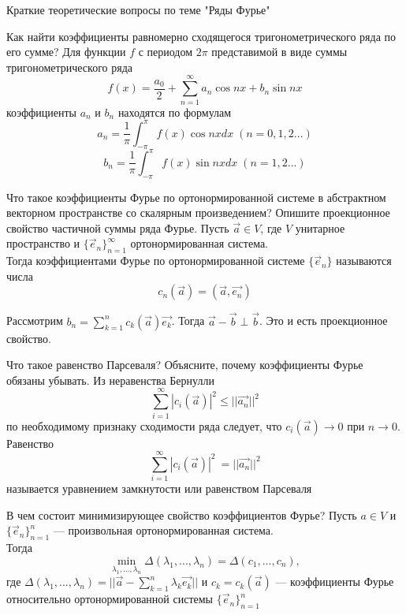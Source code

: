 \documentclass{article}
\begin{document}
\begin{section}{Краткие теоретические вопросы по теме "Ряды Фурье"}

\begin{subsection}{Как найти коэффициенты равномерно сходящегося тригонометрического ряда по его сумме?}
Для функции $f$ с периодом $2\pi$ представимой в виде суммы тригонометрического ряда 
\[f(x) = \frac{a_0}{2}+\sum_{n=1}^{\infty}a_n \cos nx +b_n \sin nx\]
коэффициенты $a_n$ и $b_n$ находятся по формулам
\[a_n = \frac{1}{\pi}\int_{-\pi}^\pi f(x)\cos n x dx\; (n = 0, 1, 2 ...)\]
\[b_n = \frac{1}{\pi}\int_{-\pi}^\pi f(x)\sin n x dx\; (n = 1, 2 ...)\]
\end{subsection}


\begin{subsection}{Что такое коэффициенты Фурье по ортонормированной системе в абстрактном векторном пространстве со скалярным произведением? Опишите проекционное свойство частичной суммы ряда Фурье.}
Пусть $\vec{a} \in V$, где $V$ унитарное пространство и $\{\vec{e}_n\}_{n=1}^{\infty}$ ортонормированная система.\\
Тогда коэффициентами Фурье по ортонормированной системе $\{\vec{e}_n\}$ называются числа 
\[ c_n(\vec{a}) = (\vec{a}, \vec{e_n})\]

Рассмотрим $b_n = \sum_{k=1}^n c_k(\vec{a})\vec{e_k}$. Тогда $\vec{a}-\vec{b} \perp \vec{b}$. Это и есть проекционное свойство.
\end{subsection}


\begin{subsection}{Что такое равенство Парсеваля? Объясните, почему коэффициенты Фурье обязаны убывать.}
Из неравенства Бернулли 
\[\sum_{i=1}^{\infty}|c_i(\vec{a})|^2\leq ||\vec{a_n}||^2\]
по необходимому признаку сходимости ряда следует, что $c_i(\vec{a}) \rightarrow 0$ при $n \rightarrow 0$.
Равенство 
\[\sum_{i=1}^{\infty}|c_i(\vec{a})|^2\ = ||\vec{a_n}||^2\]
называется уравнением замкнутости или равенством Парсеваля
\end{subsection}


\begin{subsection}{В чем состоит минимизирующее свойство коэффициентов Фурье?}
Пусть $a \in V$ и $\{\vec{e}_n\}_{n=1}^{n}$ --- произвольная ортонормированная система.\\
Тогда \[\min_{\lambda_1,...,\lambda_n} \Delta (\lambda_1,...,\lambda_n) = \Delta(c_1,...,c_n),\]
где $\Delta (\lambda_1,...,\lambda_n) = ||\vec{a}-\sum_{k=1}^n\lambda_k\vec{e_k}||$ и 
$c_k = c_k(\vec{a})$ --- коэффициенты Фурье относительно ортонормированной системы $\{\vec{e}_n\}_{n=1}^{n}$
\end{subsection}



\end{section}
\end{document}
